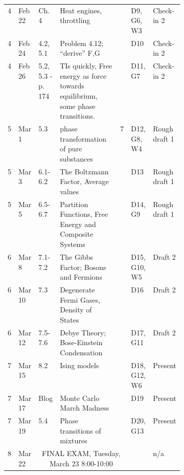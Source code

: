 \documentclass[12pt]{article}
\begin{document}
{\begin{table}[]
\begin{tabular}{p{.03\linewidth}|p{.065\linewidth}|p{.065\linewidth}|p{0.4\linewidth}|p{.08\linewidth}|p{.085\linewidth}|p{.1\linewidth}}
4    & Feb 22 & Ch. 4 &Heat engines, throttling &                                           & D9, G6, W3   & Check-in 2    \\
4    & Feb 24 & 4.2, 5.1 & Problem 4.12; ``derive'' F,G  &                                           & D10          & Check-in 2    \\
4    & Feb 26 & 5.2, 5.3 -p. 174 &TIs quickly, Free energy as force towards equilibrium, some phase transitions. &                                                                                     & D11, G7      & Check-in 2    \\ \hline
5    & Mar 1  & 5.3 & phase transformation of pure substances & 7                                       & D12, G8, W4  & Rough draft 1 \\
5    & Mar 3  & 6.1-6.2 &The Boltzmann Factor, Average values       &                                           & D13          & Rough draft 1 \\
5    & Mar 5  & 6.5-6.7        & Partition Functions, Free Energy and Composite Systems &                                           & D14, G9      & Rough draft 1 \\ \hline
6    & Mar 8  &  7.1-7.2        & The Gibbs Factor; Bosons and Fermions                            &                                           & D15, G10, W5 & Draft 2 \\
6    & Mar 10 &  7.3            & Degenerate Fermi Gases, Density of States                                                       &                                           & D16          & Draft 2 \\ 
6    & Mar 12 &  7.5-7.6        & Debye Theory; Bose-Einstein Condensation                        &                                           & D17, G11     & Draft 2 \\ \hline
7    & Mar 15 & 8.2            & Ising models &                                           & D18, G12, W6 & Present \\ \hline \hline
7    & Mar 17 & Blog &Monte Carlo March Madness &                                           & D19          & Present \\
7    & Mar 19 &5.4          &Phase transitions of mixtures &                                           & D20, G13     & Present \\ \hline
8    & Mar 22 & \multicolumn{3}{c}{FINAL EXAM, Tuesday, March 23 8:00-10:00}                                                                                                    & &n/a          
\end{tabular}
\end{table}

}
\end{document}
